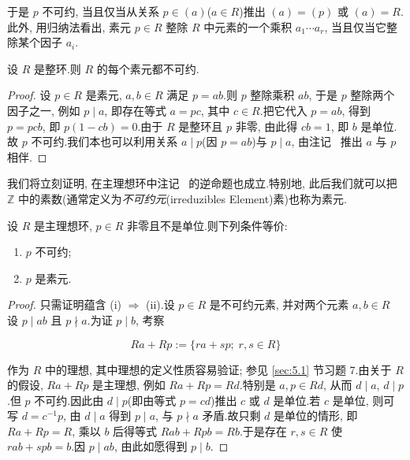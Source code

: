 于是 $p$ 不可约, 当且仅当从关系 $p \in (a)$($a \in R$)推出 $(a) = (p)$ 或 $(a) = R$.此外, 用归纳法看出, 素元 $p \in R$ 整除 $R$ 中元素的一个乘积 $a_1 \cdots a_r$, 当且仅当它整除某个因子 $a_i$.

\begin{remark}\label{rem:5.2.11}
设 $R$ 是整环.则 $R$ 的每个素元都不可约.
\end{remark}

\begin{proof}
设 $p \in R$ 是素元, $a, b \in R$ 满足 $p = ab$.则 $p$ 整除乘积 $ab$, 于是 $p$ 整除两个因子之一, 例如 $p \mid a$, 即存在等式 $a = pc$, 其中 $c \in R$.把它代入 $p = ab$, 得到 $p = pcb$, 即 $p(1 - cb) = 0$.由于 $R$ 是整环且 $p$ 非零, 由此得 $cb = 1$, 即 $b$ 是单位.故 $p$ 不可约.我们本也可以利用关系 $a \mid p$(因 $p = ab$)与 $p \mid a$, 由注记~ 推出 $a$ 与 $p$ 相伴.
\end{proof}

我们将立刻证明, 在主理想环中注记~ 的逆命题也成立.特别地, 此后我们就可以把 $\mathbb{Z}$ 中的素数(通常定义为\emph{不可约元}(\textup{irreduzibles Element})素)也称为素元.

\begin{theorem}\label{thm:5.2.12}
设 $R$ 是主理想环, $p \in R$ 非零且不是单位.则下列条件等价:
\begin{enumerate}
\item[(i)] $p$ 不可约;
\item[(ii)] $p$ 是素元.
\end{enumerate}
\end{theorem}

\begin{proof}
只需证明蕴含 (i) $\Longrightarrow$ (ii).设 $p \in R$ 是不可约元素, 并对两个元素 $a, b \in R$ 设 $p \mid ab$ 且 $p \nmid a$.为证 $p \mid b$, 考察

\[
Ra + Rp := \{ra + sp;\; r, s \in R\}
\]

作为 $R$ 中的理想, 其中理想的定义性质容易验证; 参见 \ref{sec:5.1} 节习题 7.由关于 $R$ 的假设, $Ra + Rp$ 是主理想, 例如 $Ra + Rp = Rd$.特别是 $a, p \in Rd$, 从而 $d \mid a$, $d \mid p$.但 $p$ 不可约.因此由 $d \mid p$(即由等式 $p = cd$)推出 $c$ 或 $d$ 是单位.若 $c$ 是单位, 则可写 $d = c^{-1}p$, 由 $d \mid a$ 得到 $p \mid a$, 与 $p \nmid a$ 矛盾.故只剩 $d$ 是单位的情形, 即 $Ra + Rp = R$, 乘以 $b$ 后得等式 $Rab + Rpb = Rb$.于是存在 $r, s \in R$ 使 $rab + spb = b$.因 $p \mid ab$, 由此如愿得到 $p \mid b$.
\end{proof}

